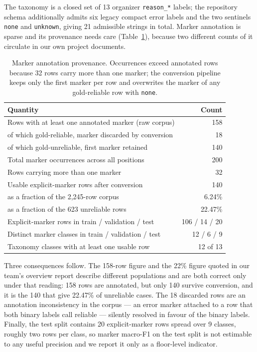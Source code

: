 \documentclass{zapiski}
\begin{document}
The taxonomy is a closed set of 13 organizer \texttt{reason\_*} labels; the
repository schema additionally admits six legacy compact error labels and the
two sentinels \texttt{none} and \texttt{unknown}, giving 21 admissible strings
in total. Marker annotation is sparse and its provenance needs care
(Table~\ref{tab:marker-provenance}), because two different counts of it
circulate in our own project documents.

\begin{table}[H]
\centering
\caption{Marker annotation provenance. Occurrences exceed annotated rows
because 32 rows carry more than one marker; the conversion pipeline keeps only
the first marker per row and overwrites the marker of any gold-reliable row
with \texttt{none}.}
\label{tab:marker-provenance}
\footnotesize
\begin{tabular}{lr}
\toprule
Quantity & Count \\
\midrule
Rows with at least one annotated marker (raw corpus)          & 158 \\
\quad of which gold-reliable, marker discarded by conversion  &  18 \\
\quad of which gold-unreliable, first marker retained         & 140 \\
Total marker occurrences across all positions                 & 200 \\
Rows carrying more than one marker                            &  32 \\
\midrule
Usable explicit-marker rows after conversion                  & 140 \\
\quad as a fraction of the 2,245-row corpus                   & 6.24\% \\
\quad as a fraction of the 623 unreliable rows                & 22.47\% \\
\midrule
Explicit-marker rows in train / validation / test             & 106 / 14 / 20 \\
Distinct marker classes in train / validation / test          & 12 / 6 / 9 \\
Taxonomy classes with at least one usable row                 & 12 of 13 \\
\bottomrule
\end{tabular}
\end{table}

Three consequences follow. The 158-row figure and the 22\% figure quoted in
our team's overview report describe different populations and are both
correct only under that reading: 158 rows are annotated, but only 140 survive
conversion, and it is the 140 that give 22.47\% of unreliable cases. The
18 discarded rows are an annotation inconsistency in the corpus --- an error
marker attached to a row that both binary labels call reliable --- silently
resolved in favour of the binary labels. Finally, the test split contains 20
explicit-marker rows spread over 9 classes, roughly two rows per class, so
marker macro-F1 on the test split is not estimable to any useful precision
and we report it only as a floor-level indicator.
\end{document}
